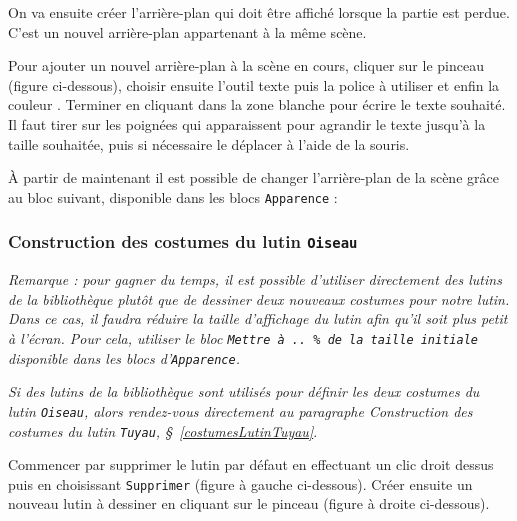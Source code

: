 	      
On va ensuite créer l'arrière-plan qui doit être affiché lorsque la partie est perdue. C'est un nouvel arrière-plan appartenant à la même scène.

Pour ajouter un nouvel arrière-plan à la scène en cours, cliquer sur le pinceau  (figure ci-dessous), choisir ensuite l'outil texte  puis la police à utiliser  et enfin la couleur . Terminer en cliquant dans la zone blanche pour écrire le texte souhaité. Il faut tirer sur les poignées qui apparaissent pour agrandir le texte jusqu'à la taille souhaitée, puis si nécessaire le déplacer à l'aide de la souris.




À partir de maintenant il est possible de changer l'arrière-plan de la scène grâce au bloc suivant, disponible dans les blocs \texttt{Apparence} :








\subsubsection{Construction des costumes du lutin \texttt{Oiseau}}

\emph{Remarque : pour gagner du temps, il est possible d'utiliser directement des lutins de la bibliothèque plutôt que de dessiner deux nouveaux costumes pour notre lutin. Dans ce cas, il faudra réduire la taille d'affichage du lutin afin qu'il soit plus petit à l'écran. Pour cela, utiliser le bloc \texttt{Mettre à ..\,\% de la taille initiale} disponible dans les blocs d'\texttt{Apparence}.}

\vspace{3pt}

\emph{Si des lutins de la bibliothèque sont utilisés pour définir les deux costumes du lutin \texttt{Oiseau}, alors rendez-vous directement au paragraphe \emph{Construction des costumes du lutin \texttt{Tuyau}}, \S\ \vref{costumesLutinTuyau}}.

\vspace{6pt}

Commencer par supprimer le lutin par défaut en effectuant un clic droit dessus puis en choisissant \texttt{Supprimer} (figure à gauche ci-dessous). Créer ensuite un nouveau lutin à dessiner en cliquant sur le pinceau (figure à droite ci-dessous).

